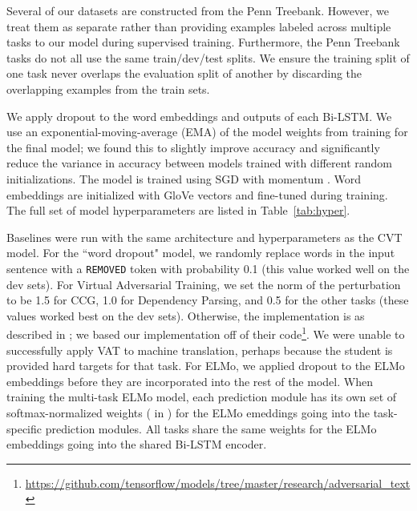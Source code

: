 \documentclass[11pt,a4paper]{article}
\newcommand{\xhdr}[1]{\vspace{1.7mm}\noindent{{\bf #1.}}}
\begin{document}
\xhdr{Multi-Task Learning}
Several of our datasets are constructed from the Penn Treebank. 
However, we treat them as separate rather than providing examples labeled across multiple tasks to our model during supervised training.
Furthermore, the Penn Treebank tasks do not all use the same train/dev/test splits. We ensure the training split of one task never overlaps the evaluation split of another by discarding the overlapping examples from the train sets. 

\xhdr{Other Details}
We apply dropout \citep{hinton2012improving} to the word embeddings and outputs of each Bi-LSTM. We use an exponential-moving-average (EMA) of the model weights from training for the final model; we found this to slightly improve accuracy and significantly reduce the variance in accuracy between models trained with different random initializations. The model is trained using SGD with momentum \citep{polyak1964some, sutskever2013importance}. Word embeddings are initialized with GloVe vectors \citep{pennington2014glove} and fine-tuned during training. The full set of model hyperparameters are listed in Table~\ref{tab:hyper}. 


\xhdr{Baselines}
Baselines were run with the same architecture and hyperparameters as the CVT model. For the ``word dropout" model, we randomly replace words in the input sentence with a \texttt{REMOVED} token with probability 0.1 (this value worked well on the dev sets). For Virtual Adversarial Training, we set the norm of the perturbation to be 1.5 for CCG, 1.0 for Dependency Parsing, and 0.5 for the other tasks (these values worked best on the dev sets). Otherwise, the implementation is as described in \citep{miyato2016adversarial}; we based our implementation off of their code\footnote{\url{https://github.com/tensorflow/models/tree/master/research/adversarial_text}}. We were unable to successfully apply VAT to machine translation, perhaps because the student is provided hard targets for that task. 
For ELMo, we applied dropout to the ELMo embeddings before they are incorporated into the rest of the model.
When training the multi-task ELMo model, each prediction module has its own set of softmax-normalized weights ( in \citep{peters2018deep}) for the ELMo emeddings going into the task-specific prediction modules. All tasks share the same  weights for the ELMo embeddings going into the shared Bi-LSTM encoder. 
\end{document}
